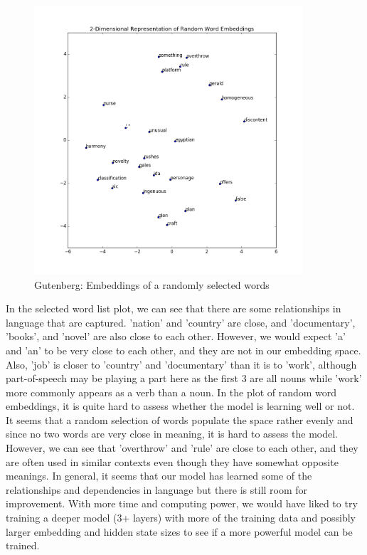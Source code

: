 \documentclass[a4paper]{article}
\begin{document}
\begin{figure}[H]
  \includegraphics[width=10cm]{../plots/gutenberg_random_word_embeddings.png}
  \centering
  \caption{Gutenberg: Embeddings of a randomly selected words}
  \label{fig:boat1}
\end{figure}

In the selected word list plot, we can see that there are some relationships in language that are captured. 'nation' and 'country' are close, and 'documentary', 'books', and 'novel' are also close to each other. However, we would expect 'a' and 'an' to be very close to each other, and they are not in our embedding space. Also, 'job' is closer to 'country' and 'documentary' than it is to 'work', although part-of-speech may be playing a part here as the first 3 are all nouns while 'work' more commonly appears as a verb than a noun. 
\newline
\newline
In the plot of random word embeddings, it is quite hard to assess whether the model is learning well or not. It seems that a random selection of words populate the space rather evenly and since no two words are very close in meaning, it is hard to assess the model. However, we can see that 'overthrow' and 'rule' are close to each other, and they are often used in similar contexts even though they have somewhat opposite meanings.
\newline
\newline
In general, it seems that our model has learned some of the relationships and dependencies in language but there is still room for improvement. With more time and computing power, we would have liked to try training a deeper model (3+ layers) with more of the training data and possibly larger embedding and hidden state sizes to see if a more powerful model can be trained.  
\end{document}
